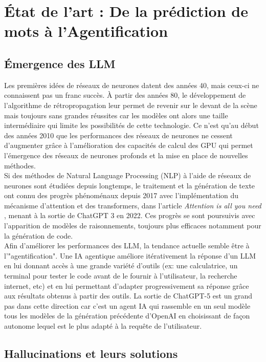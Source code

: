 \section{État de l'art : De la prédiction de mots à l'Agentification}

\subsection{Émergence des LLM}
Les premières idées de réseaux de neurones datent des années 40, mais ceux-ci ne connaissent pas un franc succès. À partir des années 80, le développement de l’algorithme de rétropropagation leur permet de revenir sur le devant de la scène mais toujours sans grandes réussites car les modèles ont alors une taille intermédiaire qui limite les possibilités de cette technologie. Ce n’est qu’au début des années 2010 que les performances des réseaux de neurones ne cessent d’augmenter grâce à l’amélioration des capacités de calcul des GPU qui permet l’émergence des réseaux de neurones profonds et la mise en place de nouvelles méthodes.
\\

Si des méthodes de Natural Language Processing (NLP) à l’aide de réseaux de neurones sont étudiées depuis longtemps, le traitement et la génération de texte ont connu des progrès phénoménaux depuis 2017 avec l’implémentation du mécanisme d’attention et des transformers, dans l’article \textit{Attention is all you need} \cite{Vaswani2017}, menant à la sortie de ChatGPT 3 en 2022. Ces progrès se sont poursuivis avec l’apparition de modèles de raisonnements, toujours plus efficaces notamment pour la génération de code.
\\

Afin d’améliorer les performances des LLM, la tendance actuelle semble être à l'"agentification". Une IA agentique améliore itérativement la réponse d’un LLM en lui donnant accès à une grande variété d’outils (ex: une calculatrice, un terminal pour tester le code avant de le fournir à l’utilisateur, la recherche internet, etc) et en lui permettant d’adapter progressivement sa réponse grâce aux résultats obtenus à partir des outils. La sortie de ChatGPT-5 est un grand pas dans cette direction car c’est un agent IA qui rassemble en un seul modèle tous les modèles de la génération précédente d'OpenAI en choisissant de façon autonome lequel est le plus adapté à la requête de l’utilisateur.

\subsection{Hallucinations et leurs solutions}


